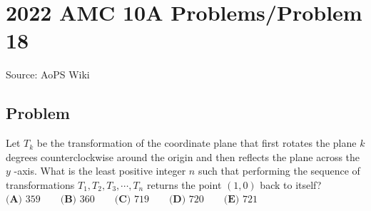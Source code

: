 \documentclass[12pt]{article}
\begin{document}
\section*{{2022 AMC 10A Problems/Problem 18}}
Source: AoPS Wiki

\subsection*{Problem}
Let $T_k$ be the transformation of the coordinate plane that first rotates the plane $k$ degrees counterclockwise around the origin and then reflects the plane across the $y$ -axis. What is the least positive
integer $n$ such that performing the sequence of transformations $T_1, T_2, T_3, \cdots, T_n$ returns the point $(1,0)$ back to itself? $\textbf{(A) } 359 \qquad \textbf{(B) } 360 \qquad \textbf{(C) } 719 \qquad \textbf{(D) } 720 \qquad \textbf{(E) } 721$
\end{document}
